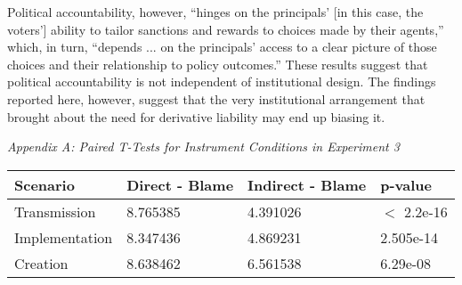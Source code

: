 \documentclass{article}
\begin{document}
Political accountability, however, ``hinges on the principals’ [in this case, the voters'] ability to tailor sanctions and rewards to choices made by their agents,'' which, in turn, ``depends ... on the principals’ access to a clear picture of those choices and their relationship to policy outcomes.'' \citep[p. 1]{Mesquita.draft} These results suggest that political accountability is not independent of institutional design. The findings reported here, however, suggest that the very institutional arrangement that brought about the need for derivative liability may end up biasing it. 

\newpage

\emph{Appendix A: Paired T-Tests for Instrument Conditions in Experiment 3}

\begin{center}
    \begin{tabular}{ | l | l | l | p{3cm} |}
    \hline
    Scenario & Direct - Blame & Indirect - Blame & p-value \\ \hline
    Transmission & 8.765385 & 4.391026  & $<$ 2.2e-16 \\ \hline
    Implementation & 8.347436 &  4.869231 & 2.505e-14 \\ \hline
    Creation & 8.638462 &   6.561538 & 6.29e-08 \\
    \hline
    \end{tabular}
\end{center}

\newpage



\end{document}
